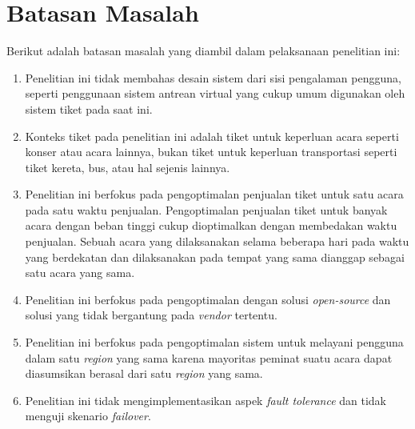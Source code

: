 \section{Batasan Masalah}
\label{sec:batasan-masalah}

Berikut adalah batasan masalah yang diambil dalam pelaksanaan penelitian ini:

\begin{enumerate}
  \item Penelitian ini tidak membahas desain sistem dari sisi pengalaman pengguna, seperti penggunaan sistem antrean virtual yang cukup umum digunakan oleh sistem tiket pada saat ini.
  \item Konteks tiket pada penelitian ini adalah tiket untuk keperluan acara seperti konser atau acara lainnya, bukan tiket untuk keperluan transportasi seperti tiket kereta, bus, atau hal sejenis lainnya.
  \item Penelitian ini berfokus pada pengoptimalan penjualan tiket untuk satu acara pada satu waktu penjualan. Pengoptimalan penjualan tiket untuk banyak acara dengan beban tinggi cukup dioptimalkan dengan membedakan waktu penjualan. Sebuah acara yang dilaksanakan selama beberapa hari pada waktu yang berdekatan dan dilaksanakan pada tempat yang sama dianggap sebagai satu acara yang sama.
  \item Penelitian ini berfokus pada pengoptimalan dengan solusi \textit{open-source} dan solusi yang tidak bergantung pada \textit{vendor} tertentu.
  \item Penelitian ini berfokus pada pengoptimalan sistem untuk melayani pengguna dalam satu \textit{region} yang sama karena mayoritas peminat suatu acara dapat diasumsikan berasal dari satu \textit{region} yang sama.
  \item Penelitian ini tidak mengimplementasikan aspek \textit{fault tolerance} dan tidak menguji skenario \textit{failover}.
\end{enumerate}

